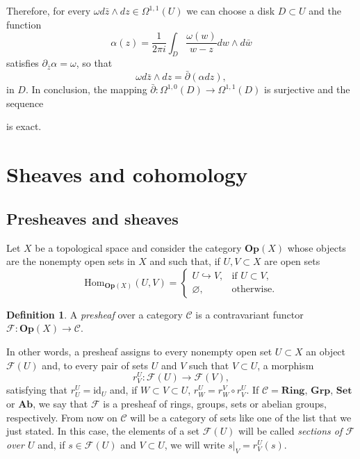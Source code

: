 \documentclass[12pt,a4paper]{book}
\theoremstyle{definition} \newtheorem{defn}[thm]{Definition}
\theoremstyle{definition} \newtheorem{ejemplo}[thm]{Example}
\theoremstyle{definition} \newtheorem{ejercicio}[thm]{Exercise}
\theoremstyle{remark} \newtheorem*{obs}{Remark}
\def\id{\mathrm{id}}
\def\FF{\mathscr{F}}
\newcommand{\ve}[1]{\mathbf{#1}}
\begin{document}
Therefore, for every $\omega d\bar{z}\wedge dz \in \Omega^{1,1}(U)$ we can choose a disk $D \subset U$ and the function
  \begin{equation*}
    \alpha(z) = \frac{1}{2\pi i}\int_D \frac{\omega(w)}{w-z} dw \wedge d\bar{w}
  \end{equation*}
  satisfies $\partial_{\bar{z}} \alpha = \omega$, so that
  \begin{equation*}
    \omega d\bar{z}\wedge dz = \bar{\partial}(\alpha dz),
  \end{equation*}
  in $D$. In conclusion, the mapping $\bar{\partial}:\Omega^{1,0}(D) \rightarrow \Omega^{1,1}(D)$ is surjective and the sequence
  \begin{center}
  \end{center}
  is exact.

    \section{Sheaves and cohomology}
    \subsection{Presheaves and sheaves}
    Let $X$ be a topological space and consider the category $\ve{Op}(X)$ whose objects are the nonempty open sets in $X$ and such that, if $U, V \subset X$ are open sets
    \begin{equation*}
      \mathrm{Hom}_{\ve{Op}(X)}(U,V)=
      \begin{cases}
	U \hookrightarrow V, & \text{if } U\subset V, \\
	\varnothing, & \text{otherwise.}
      \end{cases}
    \end{equation*}
    \begin{defn}
      A \emph{presheaf} over a category $\mathscr{C}$ is a contravariant functor $\mathscr{F}: \ve{Op}(X) \rightarrow \mathscr{C}$. 
    \end{defn}
    In other words, a presheaf assigns to every nonempty open set $U\subset X$ an object $\mathscr{F}(U)$ and, to every pair of sets $U$ and $V$ such that $V\subset U$, a morphism 
    \begin{equation*}
      r^U_V: \mathscr{F}(U) \rightarrow \FF(V),
    \end{equation*}
    satisfying that $r^U_U = \id_U$ and, if $W\subset V \subset U$, $r^U_W= r^V_W \circ r^U_V$. If $\mathscr{C}=\ve{Ring}$, $\ve{Grp}$, $\ve{Set}$ or $\ve{Ab}$, we say that $\FF$ is a presheaf of rings, groups, sets or abelian groups, respectively. From now on $\mathscr{C}$ will be a category of sets like one of the list that we just stated. In this case, the elements of a set $\FF(U)$ will be called \emph{sections of $\FF$ over $U$} and, if $s\in \FF(U)$ and $V\subset U$, we will write $s|_V=r^U_V(s)$.
\end{document}

